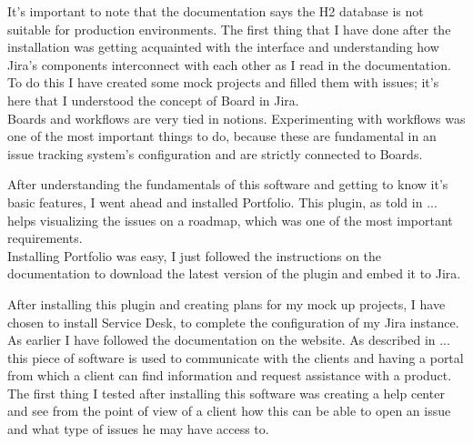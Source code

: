 	It's important to note that the documentation says the H2 database is not suitable for production environments.
	The first thing that I have done after the installation was getting acquainted with the interface and understanding how Jira's components interconnect with each other as I read in the documentation.\\
	To do this I have created some mock projects and filled them with issues; it's here that I understood the concept of Board in Jira.\\
	Boards and workflows are very tied in notions.
	Experimenting with workflows was one of the most important things to do, because these are fundamental in an issue tracking system's configuration and are strictly connected to Boards.
	
	
	After understanding the fundamentals of this software and getting to know it's basic features, I went ahead and installed Portfolio.
	This plugin, as told in ... helps visualizing the issues on a roadmap, which was one of the most important requirements.\\
	Installing Portfolio was easy, I just followed the instructions on the documentation to download the latest version of the plugin and embed it to Jira.
	
	
	After installing this plugin and creating plans for my mock up projects, I have chosen to install Service Desk, to complete the configuration of my Jira instance.
	As earlier I have followed the documentation on the website.
	As described in ... this piece of software is used to communicate with the clients and having a portal from which a client can find information and request assistance with a product.
	The first thing I tested after installing this software was creating a help center and see from the point of view of a client how this can be able to open an issue and what type of issues he may have access to.
	
	

